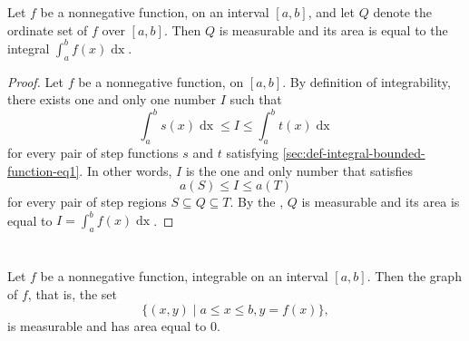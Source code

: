 \documentclass{report}
\begin{document}
\section{}%
\label{sec:measurability-ordinate-sets}
\label{sec:theorem-1.10}

\begin{theorem}[1.10]

  Let $f$ be a nonnegative function,  on an interval
    $[a, b]$, and let $Q$ denote the ordinate set of $f$ over $[a, b]$.
  Then $Q$ is measurable and its area is equal to the integral
    $\int_a^b f(x) \mathop{dx}$.

\end{theorem}

\begin{proof}

  Let $f$ be a nonnegative function,  on $[a, b]$.
  By definition of integrability, there exists one and only one number $I$ such
    that $$\int_a^b s(x) \mathop{dx} \leq I \leq \int_a^b t(x) \mathop{dx}$$ for
    every pair of step functions $s$ and $t$ satisfying
    \eqref{sec:def-integral-bounded-function-eq1}.
  In other words, $I$ is the one and only number that satisfies
    $$a(S) \leq I \leq a(T)$$ for every pair of step regions
    $S \subseteq Q \subseteq T$.
  By the , $Q$ is measurable and its area
    is equal to $I = \int_a^b f(x) \mathop{dx}$.

\end{proof}

\section{}%
\label{sec:measurability-graph-nonnegative-function}
\label{sec:theorem-1.11}

\begin{theorem}[1.11]

  Let $f$ be a nonnegative function, integrable on an interval $[a, b]$.
  Then the graph of $f$, that is, the set
    \begin{equation}
      \label{sec:measurability-graph-nonnegative-function-eq1}
      \{(x, y) \mid a \leq x \leq b, y = f(x)\},
    \end{equation}
    is measurable and has area equal to $0$.

\end{theorem}
\end{document}
